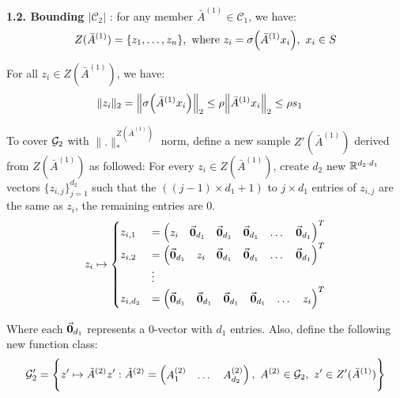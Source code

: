 \noindent\newline\textbf{1.2. Bounding $|\mathcal{C}_2|$} : for any member $\bar A^{(1)}\in \mathcal{C}_1$, we have: 
\begin{align*}
    Z(\bar A^{(1)}) = \{z_1, \dots, z_n\}, \text{ where } z_i = \sigma\Big( \bar A^{(1)}x_i \Big), \ x_i\in S
\end{align*}

\noindent For all $z_i \in Z(\bar A^{(1)})$, we have:
\begin{align*}
    \|z_i\|_2 &= \Big\| \sigma\Big( \bar A^{(1)} x_i \Big) \Big\|_2 \le \rho\Big\|\bar A^{(1)}x_i\Big\|_2 \le \rho s_1
\end{align*}

\noindent To cover $\mathcal{G}_2$ with $\|.\|_*^{Z(\bar A^{(1)})}$ norm, define a new sample $Z'(\bar A^{(1)})$ derived from $Z(\bar A^{(1)})$ as followed: For every $z_i\in Z(\bar A^{(1)})$, create $d_2$ new $\mathbb{R}^{d_2 \cdot d_1}$ vectors $\{z_{i, j}\}_{j=1}^{d_2}$ such that the $((j-1)\times d_1 + 1)$ to $j \times d_1$ entries of $z_{i,j}$ are the same as $z_i$, the remaining entries are $0$. 
\begin{align*}
    z_i \mapsto \begin{cases}
        z_{i, 1} &= \begin{pmatrix}
            z_i & \vec{\bf 0}_{d_1} & \vec{\bf 0}_{d_1} & \vec{\bf 0}_{d_1} & \dots & \vec{\bf 0}_{d_1}
        \end{pmatrix}^T \\
        z_{i, 2} &= \begin{pmatrix}
            \vec{\bf 0}_{d_1} & z_i & \vec{\bf 0}_{d_1} & \vec{\bf 0}_{d_1} & \dots & \vec{\bf 0}_{d_1}
        \end{pmatrix}^T \\
        &\vdots \\
        z_{i, d_2} &= \begin{pmatrix}
            \vec{\bf 0}_{d_1} & \vec{\bf 0}_{d_1} & \vec{\bf 0}_{d_1} & \vec{\bf 0}_{d_1} & \dots & z_i
        \end{pmatrix}^T \\
    \end{cases}    
\end{align*}

\noindent Where each $\vec{\bf 0}_{d_1}$ represents a $0$-vector with $d_1$ entries. Also, define the following new function class:
\begin{align*}
    \mathcal{G}_2' = \Bigg\{ 
        z' \mapsto \tilde A^{(2)}z' : \tilde A^{(2)} = \begin{pmatrix}
            A^{(2)}_1 & \dots & A^{(2)}_{d_2}
        \end{pmatrix},  \ A^{(2)} \in \mathcal{G}_2, \ z' \in Z'(\bar A^{(1)})
     \Bigg\}
\end{align*}

